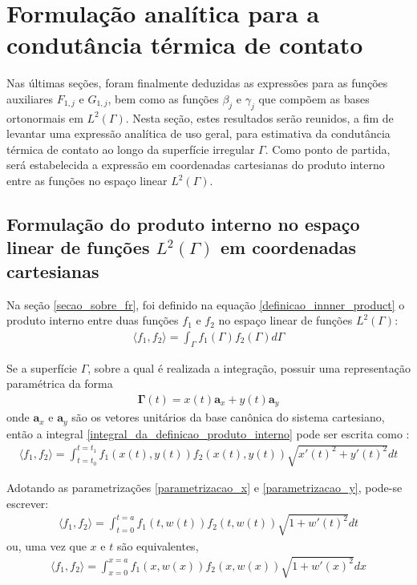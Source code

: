 \section{Formulação analítica para a condutância térmica de contato}

Nas últimas seções, foram finalmente deduzidas as expressões para as funções auxiliares $F_{1,j}$ e $G_{1,j}$, bem como as funções $\beta_j$ e $\gamma_j$ que compõem as bases ortonormais em $L^2(\Gamma)$. Nesta seção, estes resultados serão reunidos, a fim de levantar uma expressão analítica de uso geral, para estimativa da condutância térmica de contato ao longo da superfície irregular $\Gamma$. Como ponto de partida, será estabelecida a expressão em coordenadas cartesianas do produto interno entre as funções no espaço linear $L^2(\Gamma)$.

\subsection{Formulação do produto interno no espaço linear de funções $L^2(\Gamma)$ em coordenadas cartesianas}

Na seção \ref{secao_sobre_fr}, foi definido na equação \eqref{definicao_innner_product} o produto interno entre duas funções $f_1$ e $f_2$ no espaço linear de funções $L^2(\Gamma)$:
\begin{align}
\langle f_1, f_2\rangle = \int_\Gamma f_1(\Gamma) f_2(\Gamma) d\Gamma \label{integral_da_definicao_produto_interno}
\end{align}

Se a superfície $\Gamma$, sobre a qual é realizada a integração, possuir uma representação paramétrica da forma
\begin{align}
	\mathbf{\Gamma}(t) = x(t)\mathbf{a}_x + y(t)\mathbf{a}_y
\end{align}
onde $\mathbf{a}_x$ e $\mathbf{a}_y$ são os vetores unitários da base canônica do sistema cartesiano, então a integral \eqref{integral_da_definicao_produto_interno} pode ser escrita como \citep{livro_stewart}:
\begin{align}
\langle f_1, f_2\rangle = \int_{t=t_0}^{t=t_1}f_1(x(t), y(t))f_2(x(t), y(t))\sqrt{x'(t)^2 + y'(t)^2}dt \label{integral_da_definicao_produto_interno_2}
\end{align}

Adotando as parametrizações \eqref{parametrizacao_x} e \eqref{parametrizacao_y}, pode-se escrever:
\begin{align} 
\langle f_1, f_2\rangle = \int_{t=0}^{t=a}f_1(t, w(t))f_2(t, w(t))\sqrt{1 + w'(t)^2}dt \label{integral_da_definicao_produto_interno_3}
\end{align}
ou, uma vez que $x$ e $t$ são equivalentes,
\begin{align}
\langle f_1, f_2\rangle = \int_{x=0}^{x=a}f_1(x, w(x))f_2(x, w(x))\sqrt{1 + w'(x)^2}dx \label{integral_da_definicao_produto_interno_4}
\end{align}

